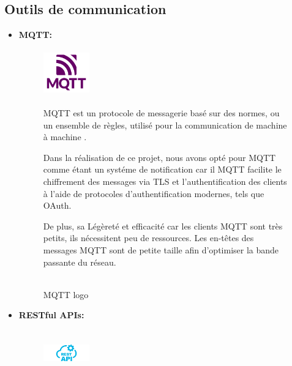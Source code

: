 \subsection{Outils de communication}
\begin{itemize}

    \item \textbf{MQTT: }
            \begin{figure}[!htb]\centering
            \begin{minipage}{0.30\textwidth}
            \centering
                {\includegraphics[width = 2cm , height=2cm]{img/techno/mqtt.png}}
                \caption{\\ MQTT logo \cite{mqtt}}\label{Fig:Data1}
            \end{minipage}
            \begin{minipage}{0.60\textwidth}
                \par MQTT est un protocole de messagerie basé sur des normes, ou un ensemble de règles, utilisé pour la communication de machine à machine \cite{mqtt}. \\
                \par Dans la réalisation de ce projet, nous avons opté pour MQTT comme étant un systéme de notification car il MQTT facilite le chiffrement des messages 
                via TLS et l'authentification des clients à l'aide de protocoles d'authentification modernes, tels que OAuth. \\
                \par De plus, sa Légèreté et efficacité car les clients MQTT sont très petits, ils nécessitent peu de ressources. Les en-têtes des messages MQTT sont de petite taille afin d'optimiser la bande passante du réseau.
            \end{minipage}
    \end{figure}
    \item\textbf{RESTful APIs:}
     \begin{figure}[!htb]\centering
        \begin{minipage}{0.30\textwidth}
        \centering
            {\includegraphics[width = 2cm , height=2cm]{img/techno/rest.png}}

\end{minipage}
\end{figure}
\end{itemize}
